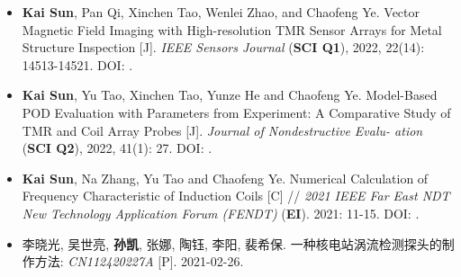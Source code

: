 \ifzh
      \begin{itemize}[leftmargin=1.5em]
            \item \textbf{Kai Sun}, Pan Qi, Xinchen Tao, Wenlei Zhao, and Chaofeng Ye. Vector Magnetic Field Imaging with High-resolution TMR Sensor Arrays for Metal Structure Inspection [J]. \textsl{IEEE Sensors Journal} (\textbf{SCI Q1}), 2022, 22(14): 14513-14521. DOI: .
                  \\{ \footnotesize {}}

            \item \textbf{Kai Sun}, Yu Tao, Xinchen Tao, Yunze He and Chaofeng Ye. Model-Based POD Evaluation with Parameters from Experiment: A Comparative Study of TMR and Coil Array Probes [J]. \textsl{Journal of Nondestructive Evalu- ation} (\textbf{SCI Q2}), 2022, 41(1): 27. DOI: .
                  \\{ \footnotesize {}}

            \item \textbf{Kai Sun}, Na Zhang, Yu Tao and Chaofeng Ye. Numerical Calculation of Frequency Characteristic of Induction Coils [C] // \textsl{2021 IEEE Far East NDT New Technology Application Forum (FENDT)} (\textbf{EI}). 2021: 11-15. DOI: .
                  \\{ \footnotesize {}}

            \item 李晓光, 吴世亮, \textbf{孙凯}, 张娜, 陶钰, 李阳, 裴希保. 一种核电站涡流检测探头的制作方法: \textsl{CN112420227A} [P]. 2021-02-26.
      \end{itemize}
\else

